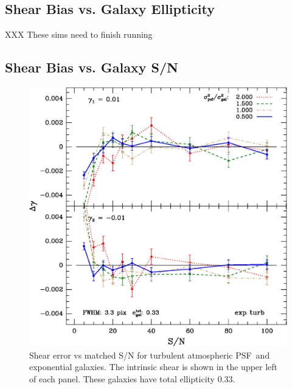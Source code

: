 \documentclass[12pt,preprint]{aastex}
\newcommand{\psf}{PSF}
\begin{document}
\subsection{Shear Bias vs. Galaxy Ellipticity}


XXX These sims need to finish running



\subsection{Shear Bias vs. Galaxy S/N}

\begin{figure}[t] \centering \centering
\includegraphics[scale=0.7]{figures/gmix-fit-et04r02-yr-0.005-0.005-diff.eps}

 \caption{Shear error vs matched S/N for turbulent atmospheric \psf\
 and exponential galaxies. The intrinsic shear is shown in the upper left of
 each panel.  These galaxies have total ellipticity 0.33.
 \label{fig:et04r02}}

\end{figure}
\end{document}
